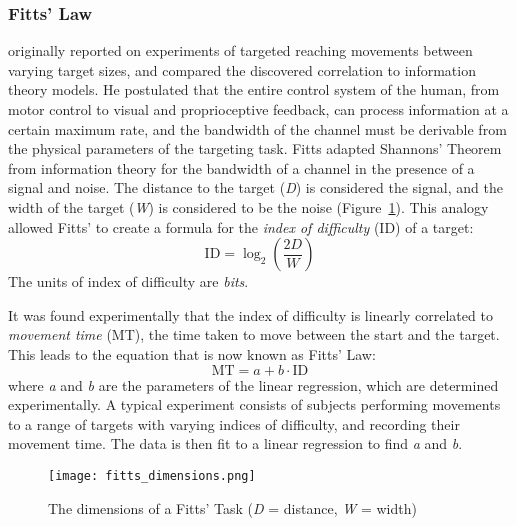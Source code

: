 \subsubsection{Fitts' Law}
\label{fitts-law}

\citet{fitts_information_1954} originally reported on experiments of targeted reaching movements between varying target sizes, and compared the discovered correlation to information theory models.
He postulated that the entire control system of the human, from motor control to visual and proprioceptive feedback, can process information at a certain maximum rate, and the bandwidth of the channel must be derivable from the physical parameters of the targeting task.
Fitts adapted Shannons' Theorem \citep{shannon_communication_1949} from information theory for the bandwidth of a channel in the presence of a signal and noise.
The distance to the target (\emph{D}) is considered the signal, and the width of the target (\emph{W}) is considered to be the noise (Figure~\ref{fig:intro_fitts}).
This analogy allowed Fitts' to create a formula for the \emph{index of difficulty} (\(\text{ID}\)) of a target:
\begin{equation}
    \mathrm{ID} = \log_2\left(\frac{2D}{W}\right)
    \label{eq:intro_id}
\end{equation}
The units of index of difficulty are \emph{bits}.

It was found experimentally that the index of difficulty is linearly correlated to \emph{movement time} (MT), the time taken to move between the start and the target.
This leads to the equation that is now known as Fitts' Law:
\begin{equation}
    \mathrm{MT} = a + b \cdot \mathrm{ID}
\end{equation}
where \emph{a} and \emph{b} are the parameters of the linear regression, which are determined experimentally.
A typical experiment consists of subjects performing movements to a range of targets with varying indices of difficulty, and recording their movement time.
The data is then fit to a linear regression to find \emph{a} and \emph{b}.

\begin{figure}
    \centering
    \texttt{[image: fitts\_dimensions.png]}
    \caption{The dimensions of a Fitts' Task (\emph{D} = distance, \emph{W} = width)}
    \label{fig:intro_fitts}
\end{figure}

